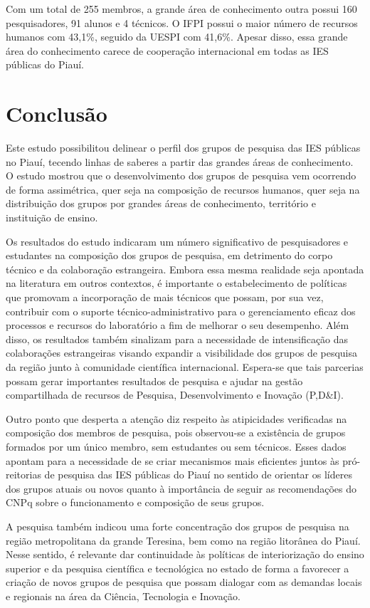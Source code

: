 \documentclass[portuguese]{textolivre}
\begin{document}
Com um total de 255 membros, a grande área de conhecimento outra possui 160 pesquisadores, 91 alunos e 4 técnicos. O IFPI possui o maior número de recursos humanos com 43,1\%, seguido da UESPI com 41,6\%. Apesar disso, essa grande área do conhecimento carece de cooperação internacional em todas as IES públicas do Piauí.

\section{Conclusão}\label{sec-organizacao-latex}
Este estudo possibilitou delinear o perfil dos grupos de pesquisa das IES públicas no Piauí, tecendo linhas de saberes a partir das grandes áreas de conhecimento. O estudo mostrou que o desenvolvimento dos grupos de pesquisa vem ocorrendo de forma assimétrica, quer seja na composição de recursos humanos, quer seja na distribuição dos grupos por grandes áreas de conhecimento, território e instituição de ensino.

Os resultados do estudo indicaram um número significativo de pesquisadores e estudantes na composição dos grupos de pesquisa, em detrimento do corpo técnico e da colaboração estrangeira. Embora essa mesma realidade seja apontada na literatura em outros contextos, é importante o estabelecimento de políticas que promovam a incorporação de mais técnicos que possam, por sua vez, contribuir com o suporte técnico-administrativo para o gerenciamento eficaz dos processos e recursos do laboratório a fim de melhorar o seu desempenho. Além disso, os resultados também sinalizam para a necessidade de intensificação das colaborações estrangeiras visando expandir a visibilidade dos grupos de pesquisa da região junto à comunidade científica internacional. Espera-se que tais parcerias possam gerar importantes resultados de pesquisa e ajudar na gestão compartilhada de recursos de Pesquisa, Desenvolvimento e Inovação (P,D\&I). 

Outro ponto que desperta a atenção diz respeito às atipicidades verificadas na composição dos membros de pesquisa, pois observou-se a existência de grupos formados por um único membro, sem estudantes ou sem técnicos. Esses dados apontam para a necessidade de se criar mecanismos mais eficientes juntos às pró-reitorias de pesquisa das IES públicas do Piauí no sentido de orientar os líderes dos grupos atuais ou novos quanto à importância de seguir as recomendações do CNPq sobre o funcionamento e composição de seus grupos.

 A pesquisa também indicou uma forte concentração dos grupos de pesquisa na região metropolitana da grande Teresina, bem como na região litorânea do Piauí. Nesse sentido, é relevante dar continuidade às políticas de interiorização do ensino superior e da pesquisa científica e tecnológica no estado de forma a favorecer a criação de novos grupos de pesquisa que possam dialogar com as demandas locais e regionais na área da Ciência, Tecnologia e Inovação.
 
\end{document}
